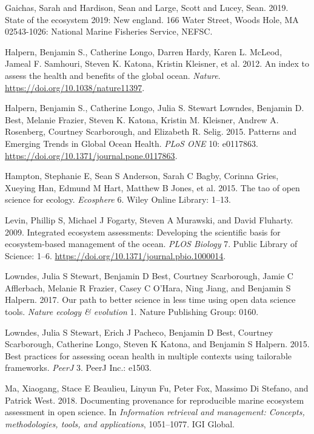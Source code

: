 \documentclass[
]{article}
\newlength{\cslhangindent}
\newenvironment{cslreferences}%
  {\setlength{\parindent}{0pt}%
  \everypar{\setlength{\hangindent}{\cslhangindent}}\ignorespaces}%
  {\par}
\begin{document}
\hypertarget{refs}{}
\begin{cslreferences}
\leavevmode\hypertarget{ref-SOE-NEFMC2019}{}%
Gaichas, Sarah and Hardison, Sean and Large, Scott and Lucey, Sean.
2019. State of the ecosystem 2019: New england. 166 Water Street, Woods
Hole, MA 02543-1026: National Marine Fisheries Service, NEFSC.

\leavevmode\hypertarget{ref-halpern2012}{}%
Halpern, Benjamin S., Catherine Longo, Darren Hardy, Karen L. McLeod,
Jameal F. Samhouri, Steven K. Katona, Kristin Kleisner, et al. 2012. An
index to assess the health and benefits of the global ocean.
\emph{Nature}. \url{https://doi.org/10.1038/nature11397}.

\leavevmode\hypertarget{ref-halpern2015}{}%
Halpern, Benjamin S., Catherine Longo, Julia S. Stewart Lowndes,
Benjamin D. Best, Melanie Frazier, Steven K. Katona, Kristin M.
Kleisner, Andrew A. Rosenberg, Courtney Scarborough, and Elizabeth R.
Selig. 2015. Patterns and Emerging Trends in Global Ocean Health.
\emph{PLoS ONE} 10: e0117863.
\url{https://doi.org/10.1371/journal.pone.0117863}.

\leavevmode\hypertarget{ref-hampton2015}{}%
Hampton, Stephanie E, Sean S Anderson, Sarah C Bagby, Corinna Gries,
Xueying Han, Edmund M Hart, Matthew B Jones, et al. 2015. The tao of
open science for ecology. \emph{Ecosphere} 6. Wiley Online Library:
1--13.

\leavevmode\hypertarget{ref-Levin2009}{}%
Levin, Phillip S, Michael J Fogarty, Steven A Murawski, and David
Fluharty. 2009. Integrated ecosystem assessments: Developing the
scientific basis for ecosystem-based management of the ocean. \emph{PLOS
Biology} 7. Public Library of Science: 1--6.
\url{https://doi.org/10.1371/journal.pbio.1000014}.

\leavevmode\hypertarget{ref-lowndes2017}{}%
Lowndes, Julia S Stewart, Benjamin D Best, Courtney Scarborough, Jamie C
Afflerbach, Melanie R Frazier, Casey C O'Hara, Ning Jiang, and Benjamin
S Halpern. 2017. Our path to better science in less time using open data
science tools. \emph{Nature ecology \& evolution} 1. Nature Publishing
Group: 0160.

\leavevmode\hypertarget{ref-lowndes2015}{}%
Lowndes, Julia S Stewart, Erich J Pacheco, Benjamin D Best, Courtney
Scarborough, Catherine Longo, Steven K Katona, and Benjamin S Halpern.
2015. Best practices for assessing ocean health in multiple contexts
using tailorable frameworks. \emph{PeerJ} 3. PeerJ Inc.: e1503.

\leavevmode\hypertarget{ref-ma2018}{}%
Ma, Xiaogang, Stace E Beaulieu, Linyun Fu, Peter Fox, Massimo Di
Stefano, and Patrick West. 2018. Documenting provenance for reproducible
marine ecosystem assessment in open science. In \emph{Information
retrieval and management: Concepts, methodologies, tools, and
applications}, 1051--1077. IGI Global.


\end{cslreferences}
\end{document}
